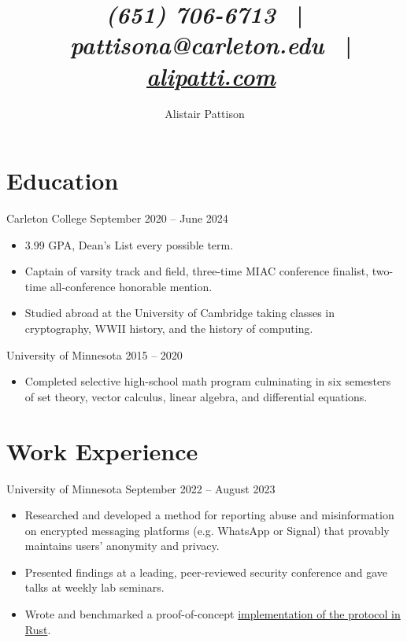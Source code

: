\documentclass{ali-resume}
\author{Alistair Pattison}
\title{
{\it (651) 706-6713}
\ | \
{\it pattisona@carleton.edu}
\ | \
\href{http://alipatti.com}{\it alipatti.com}
}
\begin{document}
\maketitle

\section{Education}

{Carleton College}
{September 2020 -- June 2024}

\begin{itemize}
	\item 3.99 GPA, Dean's List every possible term.
	\item Captain of varsity track and field, three-time MIAC conference finalist, two-time all-conference honorable mention.
	\item Studied abroad at the University of Cambridge taking classes in cryptography, WWII history, and the history of computing.
\end{itemize}

{University of Minnesota}
{2015 -- 2020}

\begin{itemize}
	\item Completed selective high-school math program culminating in six semesters of set theory, vector calculus, linear algebra, and differential equations.
\end{itemize}

\section{Work Experience}



{University of Minnesota}
{September 2022 -- August 2023}

\begin{itemize}
	\item Researched and developed a method for reporting abuse and misinformation on encrypted messaging platforms (e.g. WhatsApp or Signal) that provably maintains users' anonymity and privacy.
	\item Presented findings at a leading, peer-reviewed security conference and gave talks at weekly lab seminars.
	\item Wrote and benchmarked a proof-of-concept \href{http://github.com/alipatti/cerberus}{implementation of the protocol in Rust}.
\end{itemize}
\end{document}
